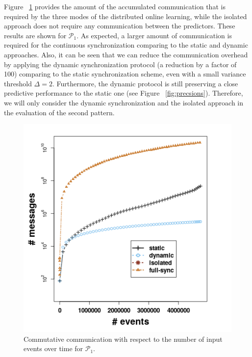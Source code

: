  
\par Figure ~\ref{fig:comm} provides the amount of the accumulated communication that is required by the three modes of the distributed online learning, while the isolated approach does not require any communication between the predictors. These results are shown  for $\mathcal{P}_1$.  As expected, a larger amount of communication is required for the continuous synchronization comparing to the static and dynamic approaches. Also, it can be seen that we can reduce the communication overhead by applying the dynamic synchronization protocol (a reduction by a factor of 100) comparing to the static synchronization scheme, even with a small variance threshold $\Delta=2$. Furthermore,  the dynamic  protocol is still preserving a close predictive performance to the static one (see Figure ~\ref{fig:precsions}).  Therefore, we will only consider the dynamic synchronization and the isolated approach in the  evaluation of the second pattern.

\begin{center}
	
	\begin{figure}[]
		
		\includegraphics[width=\textwidth]{chapters/figures/messages_p1.png}
		
		\caption{Commutative communication with respect to the number of input events over time for $\mathcal{P}_1$.}
		\label{fig:comm}
	\end{figure}
\end{center}




